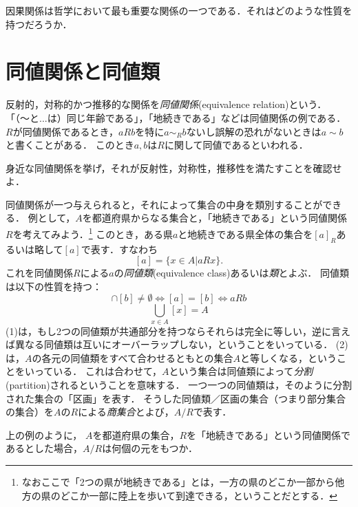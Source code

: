 \documentclass[11pt,a4paper]{jsarticle} %
\begin{document}
\begin{example}[因果性]
 因果関係は哲学において最も重要な関係の一つである．それはどのような性質を持つだろうか．
\end{example}


\section{同値関係と同値類}
反射的，対称的かつ推移的な関係を\emph{同値関係}(equivalence relation)という．
「（〜と...は）同じ年齢である」，「地続きである」などは同値関係の例である．
$R$が同値関係であるとき，$aRb$を特に$a\sim_R b$ないし誤解の恐れがないときは$a \sim b$と書くことがある．
このとき$a,b$は$R$に関して同値であるといわれる．

\begin{exercise}
 身近な同値関係を挙げ，それが反射性，対称性，推移性を満たすことを確認せよ．
\end{exercise}

\begin{answer}
 
\end{answer}

同値関係が一つ与えられると，それによって集合の中身を類別することができる．
例として，$A$を都道府県からなる集合と，「地続きである」という同値関係$R$を考えてみよう．\footnote{なおここで「2つの県が地続きである」とは，一方の県のどこか一部から他方の県のどこか一部に陸上を歩いて到達できる，ということだとする．}
このとき，ある県$a$と地続きである県全体の集合を$[a]_R$あるいは略して$[a]$で表す．すなわち
\[
 [a] = \{x \in A | aRx\}.
\]
これを同値関係$R$による$a$の\emph{同値類}(equivalence class)あるいは\emph{類}とよぶ．
同値類は以下の性質を持つ：
\begin{equation}
[a] \cap [b] \neq \emptyset  \iff [a] = [b] \iff aRb
\end{equation}
\begin{equation}
\bigcup_{x \in A} [x] = A
\end{equation}
(1)は，もし2つの同値類が共通部分を持つならそれらは完全に等しい，逆に言えば異なる同値類は互いにオーバーラップしない，ということをいっている．
(2)は，$A$の各元の同値類をすべて合わせるともとの集合$A$と等しくなる，ということをいっている．
これは合わせて，$A$という集合は同値類によって\emph{分割}(partition)されるということを意味する．
一つ一つの同値類は，そのように分割された集合の「区画」を表す．
そうした同値類／区画の集合（つまり部分集合の集合）を$A$の$R$による\emph{商集合}とよび，$A/R$で表す．

\begin{exercise}
上の例のように， $A$を都道府県の集合，$R$を「地続きである」という同値関係であるとした場合，$A/R$は何個の元をもつか．
\end{exercise}
\end{document}
